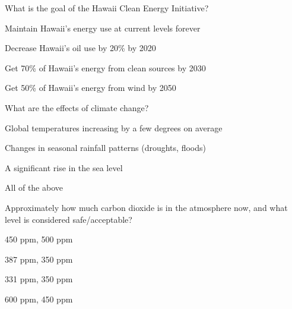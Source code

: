 \documentclass[11pt]{article}
\begin{document}
\begin{question}
	\item What is the goal of the Hawaii Clean Energy Initiative?
\end{question}

\begin{answer}
	\item Maintain Hawaii's energy use at current levels forever
	\item Decrease Hawaii's oil use by 20\% by 2020
	\item Get 70\% of Hawaii's energy from clean sources by 2030
	\item Get 50\% of Hawaii's energy from wind by 2050
\end{answer}

\begin{question}
	\item What are the effects of climate change?
\end{question}

\begin{answer}
	\item Global temperatures increasing by a few degrees on average
	\item Changes in seasonal rainfall patterns (droughts, floods)
	\item A significant rise in the sea level
	\item All of the above
\end{answer}

\begin{question}
	\item Approximately how much carbon dioxide is in the atmosphere now, and what level is considered safe/acceptable?
\end{question}

\begin{answer}
	\item 450 ppm, 500 ppm
	\item 387 ppm, 350 ppm
	\item 331 ppm, 350 ppm
	\item 600 ppm, 450 ppm
\end{answer}
\end{document}
